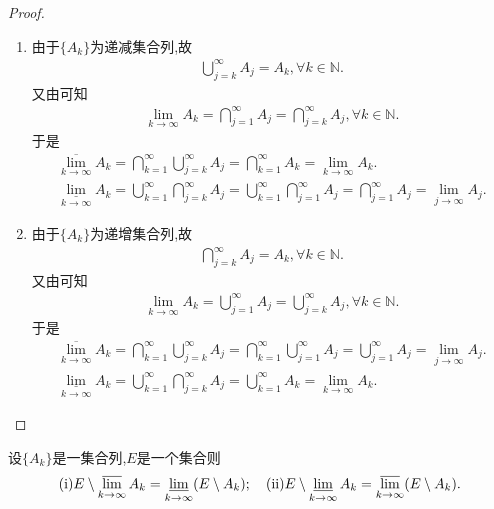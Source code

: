 \documentclass[../../main.tex]{subfiles}
\begin{document}
\begin{proof}
\begin{enumerate}
\item 由于$\{A_k\}$为递减集合列,故
\begin{align*}
\bigcup_{j=k}^{\infty}{A_j}=A_k,\forall k\in \mathbb{N} .
\end{align*}
又由可知
\begin{align*}
\underset{k\rightarrow \infty}{\lim}A_k=\bigcap_{j=1}^{\infty}{A_j}=\bigcap_{j=k}^{\infty}{A_j},\forall k\in \mathbb{N} .
\end{align*}
于是
\begin{gather*}
\underset{k\rightarrow \infty}{\overline{\lim }}A_k=\bigcap_{k=1}^{\infty}{\bigcup_{j=k}^{\infty}{A_j}}=\bigcap_{k=1}^{\infty}{A_k}=\underset{k\rightarrow \infty}{\lim}A_k.
\\
\underset{k\rightarrow \infty}{\underline{\lim }}A_k=\bigcup_{k=1}^{\infty}{\bigcap_{j=k}^{\infty}{A_j}}=\bigcup_{k=1}^{\infty}{\bigcap_{j=1}^{\infty}{A_j}}=\bigcap_{j=1}^{\infty}{A_j}=\underset{j\rightarrow \infty}{\lim}A_j.
\end{gather*}

\item 由于$\{A_k\}$为递增集合列,故
\begin{align*}
\bigcap_{j=k}^{\infty}{A_j}=A_k,\forall k\in \mathbb{N} .
\end{align*}
又由可知
\begin{align*}
\underset{k\rightarrow \infty}{\lim}A_k=\bigcup_{j=1}^{\infty}{A_j}=\bigcup_{j=k}^{\infty}{A_j},\forall k\in \mathbb{N} .
\end{align*}
于是
\begin{gather*}
\underset{k\rightarrow \infty}{\overline{\lim }}A_k=\bigcap_{k=1}^{\infty}{\bigcup_{j=k}^{\infty}{A_j}}=\bigcap_{k=1}^{\infty}{\bigcup_{j=1}^{\infty}{A_j}}=\bigcup_{j=1}^{\infty}{A_j}=\underset{j\rightarrow \infty}{\lim}A_j.
\\
\underset{k\rightarrow \infty}{\underline{\lim }}A_k=\bigcup_{k=1}^{\infty}{\bigcap_{j=k}^{\infty}{A_j}}=\bigcup_{k=1}^{\infty}{A_k}=\underset{k\rightarrow \infty}{\lim}A_k.
\end{gather*}
\end{enumerate}

\end{proof}

\begin{proposition}[上、下极限集的性质]\label{proposition:上、下极限集的性质}
  设\(\{A_k\}\)是一集合列,$E$是一个集合则
\begin{align*}
  (\text{i}) E\setminus\varlimsup_{k\rightarrow\infty}A_k=\varliminf_{k\rightarrow\infty}(E\setminus A_k);\quad (\text{ii}) E\setminus\varliminf_{k\rightarrow\infty}A_k=\varlimsup_{k\rightarrow\infty}(E\setminus A_k).
\end{align*}
\end{proposition}
\end{document}
